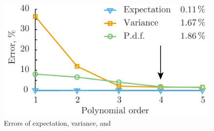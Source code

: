 \begin{figure}
  \centering
  \includegraphics[width=0.8\columnwidth]{include/assets/accuracy.pdf}
  \caption{Errors of expectation, variance, and \pdf}
  \vspace{-1.6em}
\end{figure}
